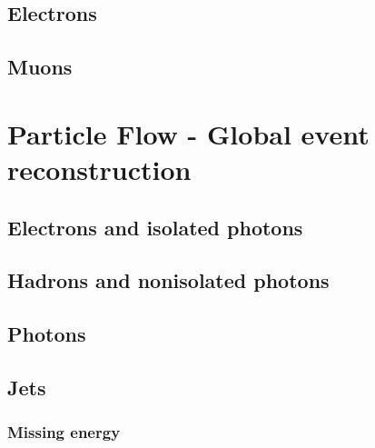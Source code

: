 \subsection{Electrons}


\subsection{Muons}
\label{sec:muonReco}


\section{Particle Flow - Global event reconstruction}
\label{sec:ParticleFlow}


\subsection{Electrons and isolated photons}



\subsection{Hadrons and nonisolated photons}


\subsection{Photons}
\label{sec:photons}


\subsection{Jets}
\label{sec:jets}


\subsubsection{Missing energy}


